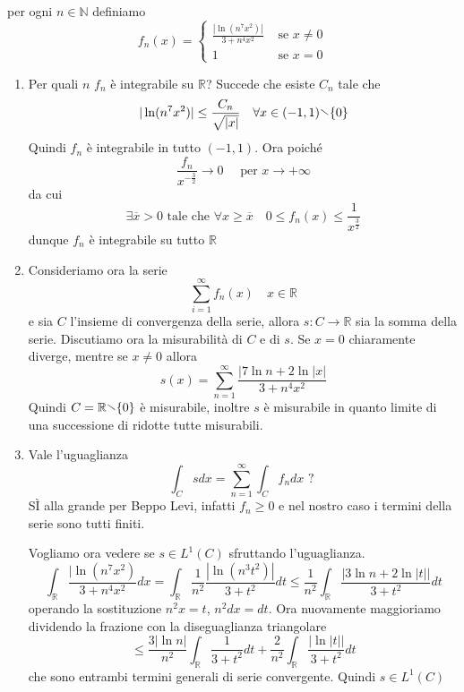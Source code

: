 \begin{eser}
    per ogni \(n \in \mathbb{N}\) definiamo \[f_{n}(x) =
        \begin{cases}
            \displaystyle
        \frac{|\ln (n^{7} x^2)|}{3 + n^{4}x^2} & \text{ se } x \neq 0 \\
        1 & \text{ se } x = 0
\end{cases}
\]
\begin{enumerate}[label = \alph*)]
    \item Per quali \(n\) \(f_{n}\) è integrabile su \(\mathbb{R}\)? Succede che
        esiste \(C_{n}\) tale che 
        \[
            |\ln (n^{7} x^2)| \le \frac{C_{n}}{\sqrt{ |x| }} \quad \forall x \in
            (-1, 1) \sminus \{0\}
        \]
        Quindi \(f_{n}\) è integrabile in tutto \((-1, 1)\).
        Ora poiché
        \[
            \frac{f_{n}}{x^{-\frac{3}{2}}} \to 0 \quad \text{ per } x \to +\infty
        \]
        da cui
        \[
            \exists  \overline{x} > 0 \text{ tale che } \forall x \ge
            \overline{x} \quad 0\le f_{n}(x) \le \frac{1}{x^{\frac{3}{2}}}
        \]
        dunque \(f_{n}\) è integrabile su tutto \(\mathbb{R}\) 
    \item Consideriamo ora la serie
        \[
            \sum_{i=1}^{\infty} f_{n}(x) \quad x \in \mathbb{R}
        \]
        e sia \(C\) l'insieme di convergenza della serie, allora \(s: C \to
        \mathbb{R}\) sia la somma della serie. Discutiamo ora la misurabilità di
        \(C\) e di \(s\).
        Se \(x = 0\) chiaramente diverge, mentre se \(x \neq 0\) allora
        \[
            s(x) = \sum_{n=1}^{\infty} \frac{|7 \ln n + 2 \ln|x|}{3 + n^{4}x^2} 
        \]
        Quindi \(C = \mathbb{R} \sminus \{0\} \) è misurabile, inoltre \(s\) è
        misurabile in quanto limite di una successione di ridotte tutte
        misurabili.
    \item Vale l'uguaglianza 
        \[
            \int_{C}  s dx = \sum_{n=1}^{\infty} \int_{C} f_{n} dx  \text{ ? }
        \]
        SÌ alla grande per Beppo Levi, infatti \(f_{n} \ge 0\) e nel nostro caso
        i termini della serie sono tutti finiti.

        Vogliamo ora vedere se \(s \in L^{1} (C)\) sfruttando l'uguaglianza.
        \[
            \int_{\mathbb{R}} \frac{|\ln(n^{7}x ^2)}{3 + n^{4}x^2} dx =
            \int_{\mathbb{R}} \frac{1}{n^2} \frac{|\ln(n^3 t^2)|}{ 3 + t^2 } dt
            \le \frac{1}{n^2} \int_{\mathbb{R}} \frac{|3 \ln n + 2 \ln |t||}{ 3 +
            t^2} dt
        \]
        operando la sostituzione \(n^2x = t\), \(n^2 dx = dt\). Ora nuovamente
        maggioriamo dividendo la frazione con la diseguaglianza triangolare
        \[
            \le \frac{3 |\ln n|}{ n^2 } \int_{\mathbb{R}} \frac{1}{3 + t^2} dt +
            \frac{2}{n^2} \int_{\mathbb{R}} \frac{|\ln |t||}{3 + t^2} dt
        \]
        che sono entrambi termini generali di serie convergente. Quindi \(s \in
        L^{1}(C)\)

\end{enumerate}
\end{eser}

